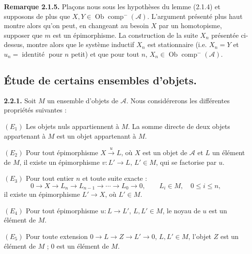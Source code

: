 \clearpage
{}%
\begingroup\small\setlength{\parskip}{0pt}\setlength{\emergencystretch}{1.5em}
\setlength{\abovedisplayskip}{4pt plus 2pt minus 2pt}%
\setlength{\belowdisplayskip}{4pt plus 2pt minus 2pt}%

\noindent\textbf{Remarque 2.1.5.}\quad
Plaçons nous sous les hypothèses du lemme (2.1.4) et supposons de plus
que $X,Y\in\operatorname{Ob}\operatorname{comp}^{-}(\mathcal A)$.
L'argument présenté plus haut montre alors qu'on peut, en changeant au
besoin $X$ par un homotopisme, supposer que $m$ est un épimorphisme. La
construction de la suite $X_n$ présentée ci-dessus, montre alors que le
système inductif $X_n$ est stationnaire (i.e. $X_n=Y$ et
$u_n=\operatorname{identité}$ pour $n$ petit) et que pour tout $n$,
$X_n\in\operatorname{Ob}\operatorname{comp}^{-}(\mathcal A)$.

\subsection{Étude de certains ensembles d'objets.}

\noindent\textbf{2.2.1.}\quad
Soit $M$ un ensemble d'objets de $\mathcal A$. Nous considérerons les
différentes propriétés suivantes :

\noindent$(E_1)$ Les objets nuls appartiennent à $M$. La somme directe de
deux objets appartenant à $M$ est un objet appartenant à $M$.

\noindent$(E_2)$ Pour tout épimorphisme
$X\xrightarrow{u}L$, où $X$ est un objet de $\mathcal A$ et $L$ un élément
de $M$, il existe un épimorphisme $v\colon L'\longrightarrow L$,
$L'\in M$, qui se factorise par $u$.

\noindent$(E_3)$ Pour tout entier $n$ et toute suite exacte :
\[
0\longrightarrow X\longrightarrow L_n\longrightarrow L_{n-1}
\longrightarrow\cdots\longrightarrow L_0\longrightarrow0,
\qquad L_i\in M,\quad0\leq i\leq n,
\]
il existe un épimorphisme $L'\longrightarrow X$, où $L'\in M$.

\noindent$(E_4)$ Pour tout épimorphisme
$u\colon L\longrightarrow L'$, $L,L'\in M$, le noyau de $u$ est un
élément de $M$.

\noindent$(E_5)$ Pour toute extension
$0\longrightarrow L\longrightarrow Z\longrightarrow L'\longrightarrow0$,
$L,L'\in M$, l'objet $Z$ est un élément de $M$ ; $0$ est un élément de
$M$.

